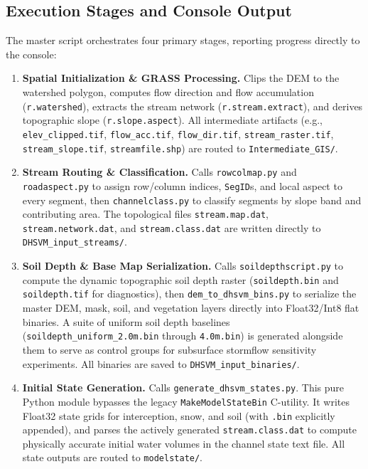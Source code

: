 \documentclass[11pt]{article}
\begin{document}
\subsection{Execution Stages and Console Output}

The master script orchestrates four primary stages, reporting progress directly to the console:

\begin{enumerate}
  \item \textbf{Spatial Initialization \& GRASS Processing.}
  Clips the DEM to the watershed polygon, computes flow direction and flow accumulation (\texttt{r.watershed}), extracts the stream network (\texttt{r.stream.extract}), and derives topographic slope (\texttt{r.slope.aspect}). All intermediate artifacts (e.g., \texttt{elev\_clipped.tif}, \texttt{flow\_acc.tif}, \texttt{flow\_dir.tif}, \texttt{stream\_raster.tif}, \texttt{stream\_slope.tif}, \texttt{streamfile.shp}) are routed to \texttt{Intermediate\_GIS/}.

  \item \textbf{Stream Routing \& Classification.}
  Calls \texttt{rowcolmap.py} and \texttt{roadaspect.py} to assign row/column indices, \texttt{SegID}s, and local aspect to every segment, then \texttt{channelclass.py} to classify segments by slope band and contributing area. The topological files \texttt{stream.map.dat}, \texttt{stream.network.dat}, and \texttt{stream.class.dat} are written directly to \texttt{DHSVM\_input\_streams/}.

  \item \textbf{Soil Depth \& Base Map Serialization.}
  Calls \texttt{soildepthscript.py} to compute the dynamic topographic soil depth raster (\texttt{soildepth.bin} and \texttt{soildepth.tif} for diagnostics), then \texttt{dem\_to\_dhsvm\_bins.py} to serialize the master DEM, mask, soil, and vegetation layers directly into Float32/Int8 flat binaries. A suite of uniform soil depth baselines (\texttt{soildepth\_uniform\_2.0m.bin} through \texttt{4.0m.bin}) is generated alongside them to serve as control groups for subsurface stormflow sensitivity experiments. All binaries are saved to \texttt{DHSVM\_input\_binaries/}.

  \item \textbf{Initial State Generation.}
  Calls \texttt{generate\_dhsvm\_states.py}. This pure Python module bypasses the legacy \texttt{MakeModelStateBin} C-utility. It writes Float32 state grids for interception, snow, and soil (with \texttt{.bin} explicitly appended), and parses the actively generated \texttt{stream.class.dat} to compute physically accurate initial water volumes in the channel state text file. All state outputs are routed to \texttt{modelstate/}.
\end{enumerate}
\end{document}
